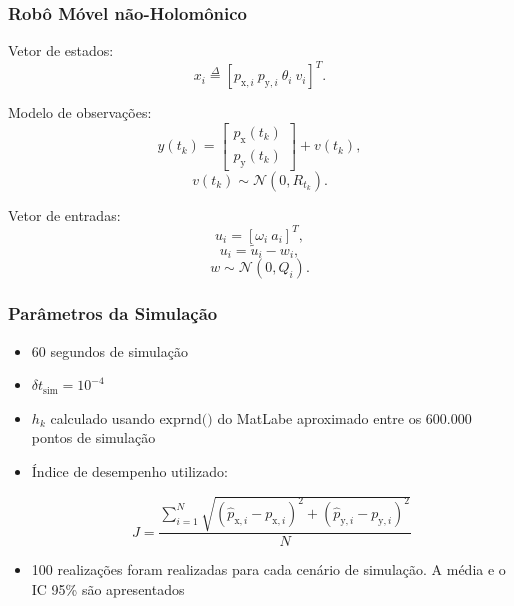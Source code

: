 \documentclass{beamer}
\renewcommand{\(}{\left(}
\renewcommand{\)}{\right)}
\renewcommand{\[}{\left[}
\renewcommand{\]}{\right]}
\begin{document}
\begin{frame}
	\frametitle{Robô Móvel não-Holomônico}
	
	Vetor de estados:
	\begin{equation*}
	x_i \overset{\Delta}{=} [p_{\textrm{x},i}\ p_{\textrm{y},i}\ \theta_i\ v_i]^T.
	\end{equation*}
	
	\vspace{0.25cm}
	Modelo de observações:
	\begin{equation*}
	y(t_k) = 
	\begin{bmatrix}
	p_{\textrm{x}}(t_k) \\
	p_{\textrm{y}}(t_k)
	\end{bmatrix}+v(t_k),
	\end{equation*}
	\begin{equation*}
	v(t_k) \sim \mathcal{N} (0,R_{t_k}).
	\end{equation*}
	
	\vspace{0.25cm}
	Vetor de entradas:
	\begin{equation*}
	u_i = [\omega_i\ a_i]^T,
	\end{equation*}
	\begin{equation*}
	u_i = \tilde{u}_i - w_i,
	\end{equation*}
	\begin{equation*}
	w \sim \mathcal{N} (0, Q_i).
	\end{equation*}


\end{frame}


\begin{frame}
\frametitle{Parâmetros da Simulação}

\begin{itemize}
	\item 60 segundos de simulação
	\vspace{0.25cm}
	\item $\delta t_{\textrm{sim}} = 10^{-4}$
	\vspace{0.25cm}
	\item $h_k$ calculado usando $\textrm{exprnd()}$ do MatLab\texttrademark e aproximado entre os 600.000 pontos de simulação
		\vspace{0.25cm}
	\item Índice de desempenho utilizado:
	
	\begin{equation*}
	J = \frac{ \sum_{i=1}^N \sqrt{(\hat{p}_{\textrm{x},i}-p_{\textrm{x},i})^2+(\hat{p}_{\textrm{y},i}-p_{\textrm{y},i})^2}}{N}
	\end{equation*}
	\vspace{0.25cm}
	\item 100 realizações foram realizadas para cada cenário de simulação. A média e o IC 95\% são apresentados

	
\end{itemize}

\end{frame}
\end{document}
